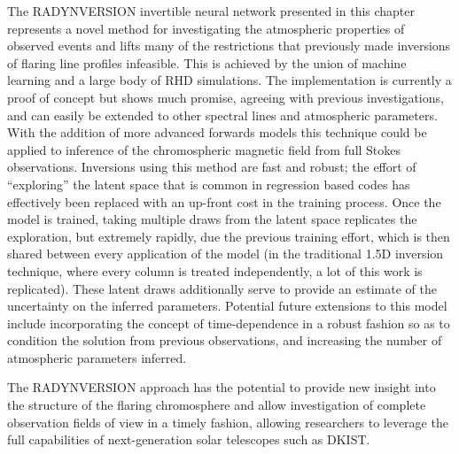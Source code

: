 The RADYNVERSION invertible neural network presented in this chapter represents a novel method for investigating the atmospheric properties of observed events and lifts many of the restrictions that previously made inversions of flaring line profiles infeasible.
This is achieved by the union of machine learning and a large body of RHD simulations.
The implementation is currently a proof of concept but shows much promise, agreeing with previous investigations, and can easily be extended to other spectral lines and atmospheric parameters.
With the addition of more advanced forwards models this technique could be applied to inference of the chromospheric magnetic field from full Stokes observations.
Inversions using this method are fast and robust; the effort of ``exploring'' the latent space that is common in regression based codes has effectively been replaced with an up-front cost in the training process.
Once the model is trained, taking multiple draws from the latent space replicates the exploration, but extremely rapidly, due the previous training effort, which is then shared between every application of the model (in the traditional 1.5D inversion technique, where every column is treated independently, a lot of this work is replicated).
These latent draws additionally serve to provide an estimate of the uncertainty on the inferred parameters.
Potential future extensions to this model include incorporating the concept of time-dependence in a robust fashion so as to condition the solution from previous observations, and increasing the number of atmospheric parameters inferred.

The RADYNVERSION approach has the potential to provide new insight into the structure of the flaring chromosphere and allow investigation of complete observation fields of view in a timely fashion, allowing researchers to leverage the full capabilities of next-generation solar telescopes such as DKIST.